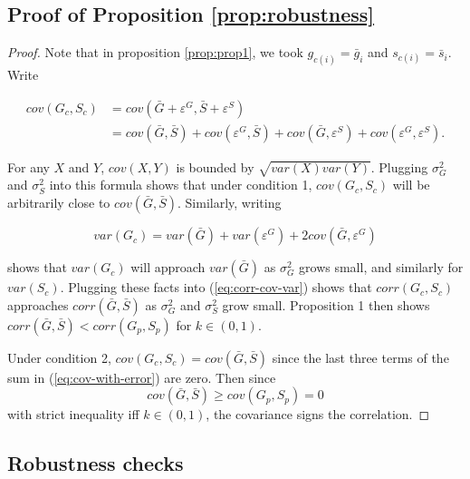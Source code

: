 \documentclass[
]{article}
\begin{document}
\hypertarget{proof-of-proposition}{%
\subsection{\texorpdfstring{Proof of Proposition \ref{prop:robustness}}{Proof of Proposition }}\label{proof-of-proposition}}

\begin{proof}

Note that in proposition \ref{prop:prop1}, we took $g_{c(i)} = \bar{g}_{i}$ and $s_{c(i)} = \bar{s}_i$. Write 

\begin{align}
cov(G_{c},S_{c}) & =cov(\bar{G}+\varepsilon^{G},\bar{S}+\varepsilon^{S})\nonumber \\
 & = cov(\bar{G},\bar{S}) + cov(\varepsilon^{G},\bar{S}) + 
     cov(\bar{G},\varepsilon^{S}) + cov(\varepsilon^{G},\varepsilon^{S}).
 \label{eq:cov-with-error}
\end{align}

For any $X$ and $Y$, $cov(X, Y)$ is bounded by $\sqrt{var(X) var(Y)}$.
Plugging $\sigma_{G}^{2}$ and $\sigma_{S}^{2}$ into this formula
shows that under condition 1, $cov(G_{c},S_{c})$ will be arbitrarily
close to $cov(\bar{G},\bar{S})$. Similarly, writing

\[
var(G_{c}) = var(\bar{G}) + var(\varepsilon^{G}) + 2cov(\bar{G},\varepsilon^{G})
\]

shows that $var(G_{c})$ will approach $var(\bar{G})$ as $\sigma_{G}^{2}$
grows small, and similarly for $var(S_{c})$. Plugging these facts
into (\ref{eq:corr-cov-var}) shows that $corr(G_{c},S_{c})$ approaches
$corr(\bar{G},\bar{S})$ as $\sigma_{G}^{2}$ and $\sigma_{S}^{2}$
grow small. Proposition 1 then shows $corr(\bar{G},\bar{S}) < corr(G_{p},S_{p})$
for $k\in(0,1)$.

Under condition 2, $cov(G_{c}, S_{c}) = cov(\bar{G},\bar{S})$ since
the last three terms of the sum in (\ref{eq:cov-with-error}) are
zero. Then since 
\[
cov(\bar{G},\bar{S})\ge cov(G_{p},S_{p}) = 0
\]
with strict inequality iff $k\in(0,1)$, the covariance signs the
correlation. 

\end{proof}

\FloatBarrier

\newpage

\hypertarget{robustness-checks}{%
\subsection{Robustness checks}\label{robustness-checks}}
\end{document}
